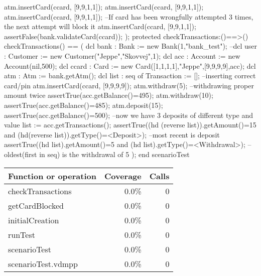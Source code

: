 \documentclass[a4paper]{article}
\begin{document}
\begin{vdm_al}
        atm.insertCard(ccard, [9,9,1,1]);
        atm.insertCard(ccard, [9,9,1,1]);
        atm.insertCard(ccard, [9,9,1,1]);
        --If card has been wrongfully attempted 3 times, the next attempt will block it
        atm.insertCard(ccard, [9,9,1,1]);
        assertFalse(bank.validateCard(ccard));
    );
    protected checkTransactions:()==>()
    checkTransactions() == (
        dcl bank : Bank := new Bank(1,"bank_test");
        --dcl user : Customer := new Customer("Jeppe","Skovvej",1);
        dcl acc : Account := new Account(nil,500);
        dcl ccard : Card := new Card([1,1,1,1],"Jeppe",[9,9,9,9],acc);
        dcl atm : Atm := bank.getAtm();
        dcl list : seq of Transaction := [];
        --inserting correct card/pin
        atm.insertCard(ccard, [9,9,9,9]);
        atm.withdraw(5); --withdrawing proper amount twice
        assertTrue(acc.getBalance()=495);
        atm.withdraw(10);
        assertTrue(acc.getBalance()=485);
        atm.deposit(15);
        assertTrue(acc.getBalance()=500); 
        --now we have 3 deposits of different type and value
        list := acc.getTransactions();
        assertTrue((hd (reverse list)).getAmount()=15 and (hd(reverse list)).getType()=<Deposit>); --most recent is deposit
        assertTrue((hd list).getAmount()=5 and (hd list).getType()=<Withdrawal>); --oldest(first in seq) is the withdrawal of 5
    );
end scenarioTest
\end{vdm_al}
\bigskip
\begin{longtable}{|l|r|r|}
\hline
Function or operation & Coverage & Calls \\
\hline
\hline
checkTransactions & 0.0\% & 0 \\
\hline
getCardBlocked & 0.0\% & 0 \\
\hline
initialCreation & 0.0\% & 0 \\
\hline
runTest & 0.0\% & 0 \\
\hline
scenarioTest & 0.0\% & 0 \\
\hline
\hline
scenarioTest.vdmpp & 0.0\% & 0 \\
\hline
\end{longtable}
\end{document}
